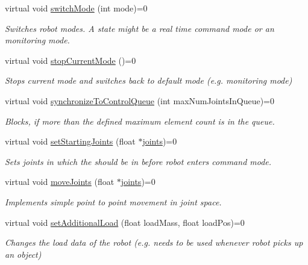 \begin{DoxyCompactItemize}
virtual void \hyperlink{classControlQueue_a0f0367b72b6b1bd75b39aeb19db93dc5}{switch\-Mode} (int mode)=0
\begin{DoxyCompactList}\small\item\em \-Switches robot modes. \-A state might be a real time command mode or an monitoring mode. \end{DoxyCompactList}\item 
virtual void \hyperlink{classControlQueue_a74ed9cbabd7a9f6a62460dbd5dc9e48d}{stop\-Current\-Mode} ()=0
\begin{DoxyCompactList}\small\item\em \-Stops current mode and switches back to default mode (e.\-g. monitoring mode) \end{DoxyCompactList}\item 
virtual void \hyperlink{classControlQueue_a37493f41806df96293a95f52f23da280}{synchronize\-To\-Control\-Queue} (int max\-Num\-Joints\-In\-Queue)=0
\begin{DoxyCompactList}\small\item\em \-Blocks, if more than the defined maximum element count is in the queue. \end{DoxyCompactList}\item 
virtual void \hyperlink{classControlQueue_ad63c9ae478a918b3e60cedbe89f78054}{set\-Starting\-Joints} (float $\ast$\hyperlink{fri__example_8m_a094bd681592faefb6f9be3d22d34cbcd}{joints})=0
\begin{DoxyCompactList}\small\item\em \-Sets joints in which the should be in before robot enters command mode. \end{DoxyCompactList}\item 
virtual void \hyperlink{classControlQueue_ac42d07279bbbf5f72928955ea71a407f}{move\-Joints} (float $\ast$\hyperlink{fri__example_8m_a094bd681592faefb6f9be3d22d34cbcd}{joints})=0
\begin{DoxyCompactList}\small\item\em \-Implements simple point to point movement in joint space. \end{DoxyCompactList}\item 
virtual void \hyperlink{classControlQueue_ae34e58840111692913a45ccde7b6fc20}{set\-Additional\-Load} (float load\-Mass, float load\-Pos)=0
\begin{DoxyCompactList}\small\item\em \-Changes the load data of the robot (e.\-g. needs to be used whenever robot picks up an object) \end{DoxyCompactList}\item 

\end{DoxyCompactItemize}
